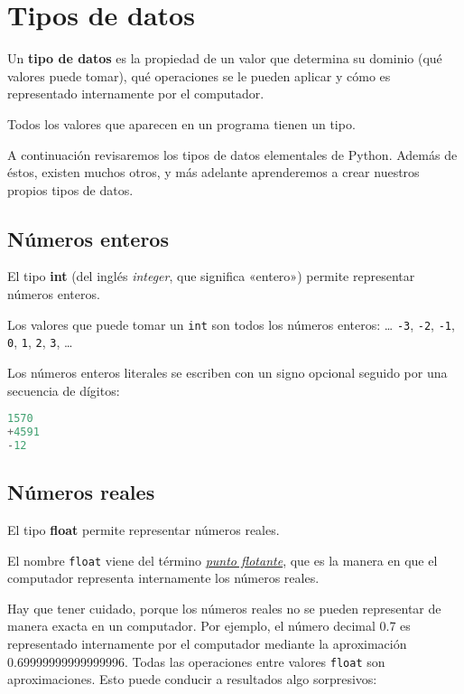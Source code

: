 \chapter{Tipos de datos}

Un \textbf{tipo de datos} es la propiedad de un valor que determina su
dominio (qué valores puede tomar), qué operaciones se le pueden aplicar
y cómo es representado internamente por el computador.

Todos los valores que aparecen en un programa tienen un tipo.

A continuación revisaremos los tipos de datos elementales de Python.
Además de éstos, existen muchos otros, y más adelante aprenderemos a
crear nuestros propios tipos de datos.

\section{Números enteros}

El tipo \textbf{int} (del inglés \emph{integer}, que significa «entero»)
permite representar números enteros.

Los valores que puede tomar un \lstinline!int! son todos los números
enteros: \ldots{} \lstinline!-3!, \lstinline!-2!, \lstinline!-1!,
\lstinline!0!, \lstinline!1!, \lstinline!2!, \lstinline!3!, \ldots{}

Los números enteros literales se escriben con un signo opcional seguido
por una secuencia de dígitos:

\begin{lstlisting}[language=py]
1570
+4591
-12
\end{lstlisting}

\section{Números reales}

El tipo \textbf{float} permite representar números reales.

El nombre \lstinline!float! viene del término
\href{http://es.wikipedia.org/wiki/Punto\_flotante}{\emph{punto flotante}}, que
es la manera en que el computador representa internamente los números
reales.

Hay que tener cuidado, porque los números reales no se pueden
representar de manera exacta en un computador. Por ejemplo, el número
decimal 0.7 es representado internamente por el computador mediante la
aproximación 0.69999999999999996. Todas las operaciones entre valores
\lstinline!float! son aproximaciones. Esto puede conducir a resultados
algo sorpresivos:

